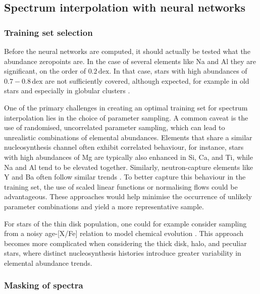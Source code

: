 \documentclass[
  journal=pasa,
  manuscript=research-paper, %
  year=2024,
  volume=37
]{cup-journal}
\begin{document}
\subsection{Spectrum interpolation with neural networks} \label{sec:caveats_interpolation}

\subsubsection{Training set selection}

Before the neural networks are computed, it should actually be tested what the abundance zeropoints are. In the case of several elements like Na and Al they are significant, on the order of $0.2\,\mathrm{dex}$. In that case, stars with high abundances of $0.7-0.8\,\mathrm{dex}$ are not sufficiently covered, although expected, for example in old stars and especially in globular clusters \citep[see e.g.][]{Carretta2009}.

One of the primary challenges in creating an optimal training set for spectrum interpolation lies in the choice of parameter sampling. A common caveat is the use of randomised, uncorrelated parameter sampling, which can lead to unrealistic combinations of elemental abundances. Elements that share a similar nucleosynthesis channel often exhibit correlated behaviour, for instance, stars with high abundances of Mg are typically also enhanced in Si, Ca, and Ti, while Na and Al tend to be elevated together. Similarly, neutron-capture elements like Y and Ba often follow similar trends \citep[e.g.][]{Ting2012, Kobayashi2020, Buder2021}. To better capture this behaviour in the training set, the use of scaled linear functions or normalising flows could be advantageous. These approaches would help minimise the occurrence of unlikely parameter combinations and yield a more representative sample. 

For stars of the thin disk population, one could for example consider sampling from a noisy age-[X/Fe] relation to model chemical evolution \citep[see Fig.~\ref{fig:galah_dr4_age_xfe_trends_solar_twins_allstar},][]{Nissen2015, Spina2016, Bedell2018}. This approach becomes more complicated when considering the thick disk, halo, and peculiar stars, where distinct nucleosynthesis histories introduce greater variability in elemental abundance trends.

\subsubsection{Masking of spectra} \label{sec:masking_spectra}
\end{document}
